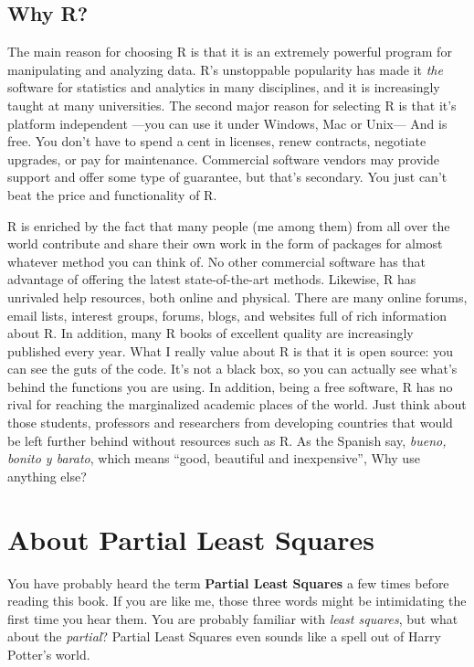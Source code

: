 \documentclass[12pt]{book}\usepackage{graphicx, color}
\begin{document}
\subsection{Why R?}
The main reason for choosing R is that it is an extremely powerful program for manipulating and analyzing data. R's unstoppable popularity has made it \textit{the} software for statistics and analytics in many disciplines, and it is increasingly taught at many universities. The second major reason for selecting R is that it's platform independent ---you can use it under Windows, Mac or Unix--- And is free. You don't have to spend a cent in licenses, renew contracts, negotiate upgrades, or pay for maintenance. Commercial software vendors may provide support and offer some type of guarantee, but that's secondary. You just can't beat the price and functionality of R.

R is enriched by the fact that many people (me among them) from all over the world contribute and share their own work in the form of packages for almost whatever method you can think of. No other commercial software has that advantage of offering the latest state-of-the-art methods. Likewise, R has unrivaled help resources, both online and physical. There are many online forums, email lists, interest groups, forums, blogs, and websites full of rich information about R. In addition, many R books of excellent quality are increasingly published every year. What I really value about R is that it is open source: you can see the guts of the code. It's not a black box, so you can actually see what's behind the functions you are using. In addition, being a free software, R has no rival for reaching the marginalized academic places of the world. Just think about those students, professors and researchers from developing countries that would be left further behind without resources such as R. As the Spanish say, \textit{bueno, bonito y barato}, which means ``good, beautiful and inexpensive'', Why use anything else?




\section{About Partial Least Squares}
You have probably heard the term \textbf{Partial Least Squares} a few times before reading this book. If you are like me, those three words might be intimidating the first time you hear them. You are probably familiar with \textit{least squares}, but what about the \textit{partial}? Partial Least Squares even sounds like a spell out of Harry Potter's world. 
\end{document}

